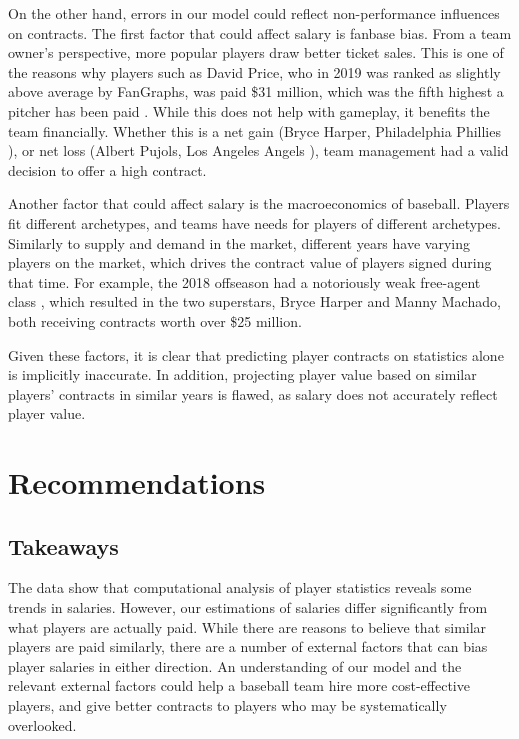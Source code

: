 \documentclass[12pt, letterpaper]{article}
\begin{document}
On the other hand, errors in our model could reflect non-performance influences on contracts. The first factor that could affect salary is fanbase bias. From a team owner's perspective, more popular players draw better ticket sales. This is one of the reasons why players such as David Price, who in 2019 was ranked as slightly above average by FanGraphs, was paid \$31 million, which was the fifth highest a pitcher has been paid \cite{baseball-reference-price}. While this does not help with gameplay, it benefits the team financially. Whether this is a net gain (Bryce Harper, Philadelphia Phillies \cite{baseball-reference-harper}), or net loss (Albert Pujols, Los Angeles Angels \cite{baseball-reference-pujols}), team management had a valid decision to offer a high contract.

Another factor that could affect salary is the macroeconomics of baseball. Players fit different archetypes, and teams have needs for players of different archetypes. Similarly to supply and demand in the market, different years have varying players on the market, which drives the contract value of players signed during that time. For example, the 2018 offseason had a notoriously weak free-agent class \cite{rosterresource-2018-fa}, which resulted in the two superstars, Bryce Harper and Manny Machado, both receiving contracts worth over \$25 million.

Given these factors, it is clear that predicting player contracts on statistics alone is implicitly inaccurate. In addition, projecting player value based on similar players' contracts in similar years is flawed, as salary does not accurately reflect player value.

\section{Recommendations}
\subsection{Takeaways}
The data show that computational analysis of player statistics reveals some trends in salaries. However, our estimations of salaries differ significantly from what players are actually paid. While there are reasons to believe that similar players are paid similarly, there are a number of external factors that can bias player salaries in either direction. An understanding of our model and the relevant external factors could help a baseball team hire more cost-effective players, and give better contracts to players who may be systematically overlooked.
\end{document}
